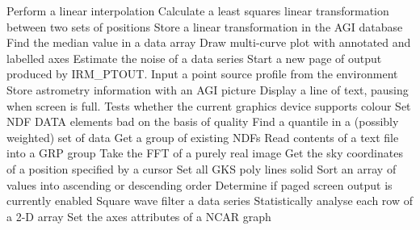   {Perform a linear interpolation}
  {Calculate a least squares linear transformation between two sets of 
   positions}
  {Store a linear transformation in the AGI database}
  {Find the median value in a data array}
  {Draw multi-curve plot with annotated and labelled axes}
  {Estimate the noise of a data series}
  {Start a new page of output produced by IRM\_PTOUT.}
  {Input a point source profile from the environment}
  {Store astrometry information with an AGI picture}
  {Display a line of text, pausing when screen is full.}
  {Tests whether the current graphics device supports colour}
  {Set NDF DATA elements bad on the basis of quality}
  {Find a quantile in a (possibly weighted) set of data}
  {Get a group of existing NDFs}
  {Read contents of a text file into a GRP group}
  {Take the FFT of a purely real image}
  {Get the sky coordinates of a position specified by a cursor}
  {Set all GKS poly lines solid}
  {Sort an array of values into ascending or descending order}
  {Determine if paged screen output is currently enabled}
  {Square wave filter a data series}
  {Statistically analyse each row of a 2-D array}
  {Set the axes attributes of a NCAR graph}
